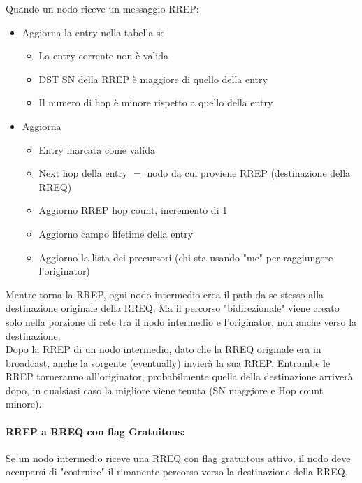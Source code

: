 Quando un nodo riceve un messaggio RREP:
\begin{itemize}
	\item Aggiorna la entry nella tabella se
	\begin{itemize}
		\item La entry corrente non è valida
		\item DST SN della RREP è maggiore di quello della entry
		\item Il numero di hop è minore rispetto a quello della entry
	\end{itemize}

	\item Aggiorna
	\begin{itemize}
		\item Entry marcata come valida
		\item Next hop della entry $=$ nodo da cui proviene RREP (destinazione della RREQ)
		\item Aggiorno RREP hop count, incremento di 1
		\item Aggiorno campo lifetime della entry
		\item Aggiorno la lista dei precursori (chi sta usando "me" per raggiungere l'originator)
	\end{itemize}
\end{itemize}

Mentre torna la RREP, ogni nodo intermedio crea il path da se stesso alla destinazione originale della RREQ. Ma il percorso "bidirezionale" viene creato solo nella porzione di rete tra il nodo intermedio e l'originator, non anche verso la destinazione.\\

Dopo la RREP di un nodo intermedio, dato che la RREQ originale era in broadcast, anche la sorgente (eventually) invierà la sua RREP. Entrambe le RREP torneranno all'originator, probabilmente quella della destinazione arriverà dopo, in qualsiasi caso la migliore viene tenuta (SN maggiore e Hop count minore).\\

\paragraph{RREP a RREQ con flag Gratuitous:} Se un nodo intermedio riceve una RREQ con flag gratuitous attivo, il nodo deve occuparsi di "costruire" il rimanente percorso verso la destinazione della RREQ.\\

